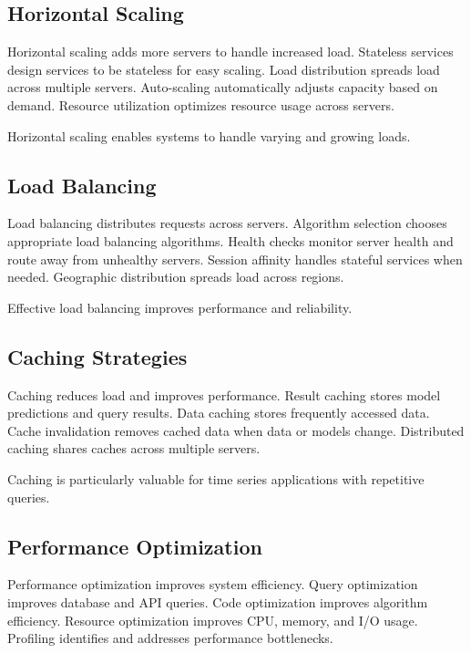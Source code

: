 \subsection{Horizontal Scaling}

Horizontal scaling adds more servers to handle increased load. Stateless services design services to be stateless for easy scaling. Load distribution spreads load across multiple servers. Auto-scaling automatically adjusts capacity based on demand. Resource utilization optimizes resource usage across servers.

Horizontal scaling enables systems to handle varying and growing loads.

\subsection{Load Balancing}

Load balancing distributes requests across servers. Algorithm selection chooses appropriate load balancing algorithms. Health checks monitor server health and route away from unhealthy servers. Session affinity handles stateful services when needed. Geographic distribution spreads load across regions.

Effective load balancing improves performance and reliability.

\subsection{Caching Strategies}

Caching reduces load and improves performance. Result caching stores model predictions and query results. Data caching stores frequently accessed data. Cache invalidation removes cached data when data or models change. Distributed caching shares caches across multiple servers.

Caching is particularly valuable for time series applications with repetitive queries.

\subsection{Performance Optimization}

Performance optimization improves system efficiency. Query optimization improves database and API queries. Code optimization improves algorithm efficiency. Resource optimization improves CPU, memory, and I/O usage. Profiling identifies and addresses performance bottlenecks.

